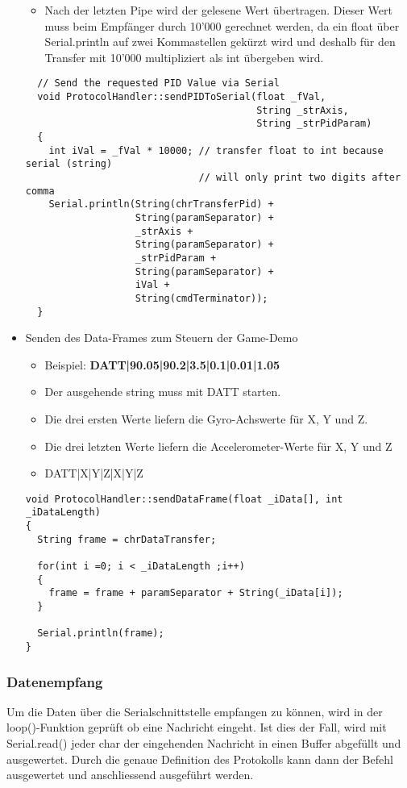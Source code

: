 \begin{itemize}
\begin{itemize}
    \item Nach der letzten Pipe wird der gelesene Wert übertragen. Dieser Wert muss beim Empfänger durch 10'000 gerechnet werden, da ein float über Serial.println auf zwei Kommastellen gekürzt wird und deshalb für den Transfer mit 10'000 multipliziert als int übergeben wird.
  \end{itemize}
  \vspace{3mm}
  \begin{lstlisting}
  // Send the requested PID Value via Serial
  void ProtocolHandler::sendPIDToSerial(float _fVal, 
                                        String _strAxis, 
                                        String _strPidParam)
  {
    int iVal = _fVal * 10000; // transfer float to int because serial (string) 
                              // will only print two digits after comma
    Serial.println(String(chrTransferPid) + 
                   String(paramSeparator) + 
                   _strAxis + 
                   String(paramSeparator) + 
                   _strPidParam + 
                   String(paramSeparator) + 
                   iVal + 
                   String(cmdTerminator));
  }
  \end{lstlisting}
\newpage
  \item Senden des Data-Frames zum Steuern der Game-Demo
  \begin{itemize}
    \item Beispiel: \textbf{DATT|90.05|90.2|3.5|0.1|0.01|1.05}
    \item Der ausgehende string muss mit DATT starten.
    \item Die drei ersten Werte liefern die Gyro-Achswerte für X, Y und Z.
    \item Die drei letzten Werte liefern die Accelerometer-Werte für X, Y und Z
    \item DATT|X|Y|Z|X|Y|Z
  \end{itemize}
  \vspace{3mm}
  \begin{lstlisting}
void ProtocolHandler::sendDataFrame(float _iData[], int _iDataLength)
{
  String frame = chrDataTransfer;

  for(int i =0; i < _iDataLength ;i++)
  {
    frame = frame + paramSeparator + String(_iData[i]);
  }

  Serial.println(frame);
}
  \end{lstlisting}
\end{itemize} 

\subsubsection{Datenempfang}
Um die Daten über die Serialschnittstelle empfangen zu können, wird in der loop()-Funktion geprüft ob eine Nachricht eingeht. Ist dies der Fall, wird mit Serial.read() jeder char der eingehenden Nachricht in einen Buffer abgefüllt und ausgewertet. Durch die genaue Definition des Protokolls kann dann der Befehl ausgewertet und anschliessend ausgeführt werden.

